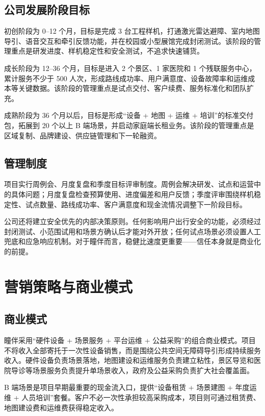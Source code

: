 \documentclass[a4paper,fontset=none]{ctexart}
\begin{document}
\subsection{公司发展阶段目标}

初创阶段为 0--12 个月，目标是完成 3 台工程样机，打通激光雷达避障、室内地图导引、语音交互和牵引反馈功能，并在校园或小型展馆完成封闭测试。该阶段的管理重点是研发进度、样机稳定性和安全测试，不追求快速铺货。

成长阶段为 12--36 个月，目标是进入 2 个景区、1 家医院和 1 个残联服务中心，累计服务不少于 500 人次，形成路线成功率、用户满意度、设备故障率和运维成本等关键数据。该阶段的管理重点是试点交付、客户续费、服务标准化和团队扩充。

成熟阶段为 36 个月以后，目标是形成“设备 + 地图 + 运维 + 培训”的标准交付包，拓展到 20 个以上 B 端场景，并启动家庭端长租业务。该阶段的管理重点是区域复制、品牌建设、供应链管理和下一轮融资。

\subsection{管理制度}

项目实行周例会、月度复盘和季度目标评审制度。周例会解决研发、试点和运营中的具体问题；月度复盘检查预算使用、进度偏差和用户反馈；季度评审围绕样机稳定性、试点数量、路线成功率、客户满意度和现金流情况调整下一阶段目标。

公司还将建立安全优先的内部决策原则。任何影响用户出行安全的功能，必须经过封闭测试、小范围试用和场景方确认后才能对外开放；任何试点场景必须设置人工兜底和应急响应机制。对于瞳伴而言，稳健比速度更重要——信任本身就是商业化的前提。

\section{营销策略与商业模式}

\subsection{商业模式}

瞳伴采用“硬件设备 + 场景服务 + 平台运维 + 公益采购”的组合商业模式。项目不将收入全部寄托于一次性设备销售，而是围绕公共空间无障碍导引形成持续服务收入。硬件设备负责场景落地，地图建设和运维服务负责建立粘性，景区导览和医院导诊等场景服务负责提升单场景收入，政府及公益采购负责扩大社会覆盖面。

B 端场景是项目早期最重要的现金流入口，提供“设备租赁 + 场景建图 + 年度运维 + 人员培训”套餐。客户不必一次性承担较高采购成本，项目则可通过租赁费、地图建设费和运维费获得稳定收入。
\end{document}
